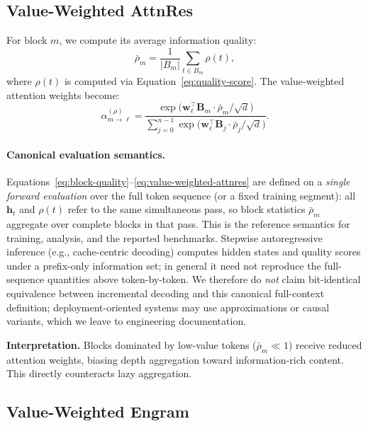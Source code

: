 \documentclass[twocolumn]{article}
\begin{document}
\subsection{Value-Weighted AttnRes}
\label{sec:qasp-attnres}

For block $m$, we compute its average information quality:
\begin{equation}
\bar{\rho}_m = \frac{1}{|B_m|} \sum_{t \in B_m} \rho(t),
\label{eq:block-quality}
\end{equation}
where $\rho(t)$ is computed via Equation~\eqref{eq:quality-score}. The value-weighted attention weights become:
\begin{equation}
\alpha_{m \rightarrow \ell}^{(\rho)} = \frac{\exp\bigl(\mathbf{w}_\ell^\top \mathbf{B}_m \cdot \bar{\rho}_m / \sqrt{d}\bigr)}{\sum_{j=0}^{n-1} \exp\bigl(\mathbf{w}_\ell^\top \mathbf{B}_j \cdot \bar{\rho}_j / \sqrt{d}\bigr)}.
\label{eq:value-weighted-attnres}
\end{equation}

\paragraph{Canonical evaluation semantics.}
Equations~\eqref{eq:block-quality}--\eqref{eq:value-weighted-attnres} are defined on a \emph{single forward evaluation} over the full token sequence (or a fixed training segment): all $\mathbf{h}_t$ and $\rho(t)$ refer to the same simultaneous pass, so block statistics $\bar{\rho}_m$ aggregate over complete blocks in that pass.
This is the reference semantics for training, analysis, and the reported benchmarks.
Stepwise autoregressive inference (e.g., cache-centric decoding) computes hidden states and quality scores under a prefix-only information set; in general it need not reproduce the full-sequence quantities above token-by-token.
We therefore do \emph{not} claim bit-identical equivalence between incremental decoding and this canonical full-context definition; deployment-oriented systems may use approximations or causal variants, which we leave to engineering documentation.

\textbf{Interpretation.} Blocks dominated by low-value tokens ($\bar{\rho}_m \ll 1$) receive reduced attention weights, biasing depth aggregation toward information-rich content. This directly counteracts lazy aggregation.

\subsection{Value-Weighted Engram}
\label{sec:qasp-engram}
\end{document}
